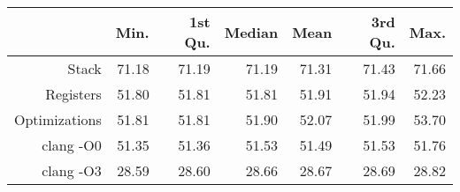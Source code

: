 \begin{table}[ht]
\centering
\begin{tabular}{rrrrrrr}
  \hline
 & Min. & 1st Qu. & Median & Mean & 3rd Qu. & Max. \\ 
  \hline
Stack & 71.18 & 71.19 & 71.19 & 71.31 & 71.43 & 71.66 \\ 
  Registers & 51.80 & 51.81 & 51.81 & 51.91 & 51.94 & 52.23 \\ 
  Optimizations & 51.81 & 51.81 & 51.90 & 52.07 & 51.99 & 53.70 \\ 
  clang -O0 & 51.35 & 51.36 & 51.53 & 51.49 & 51.53 & 51.76 \\ 
  clang -O3 & 28.59 & 28.60 & 28.66 & 28.67 & 28.69 & 28.82 \\ 
   \hline
\end{tabular}
\end{table}
